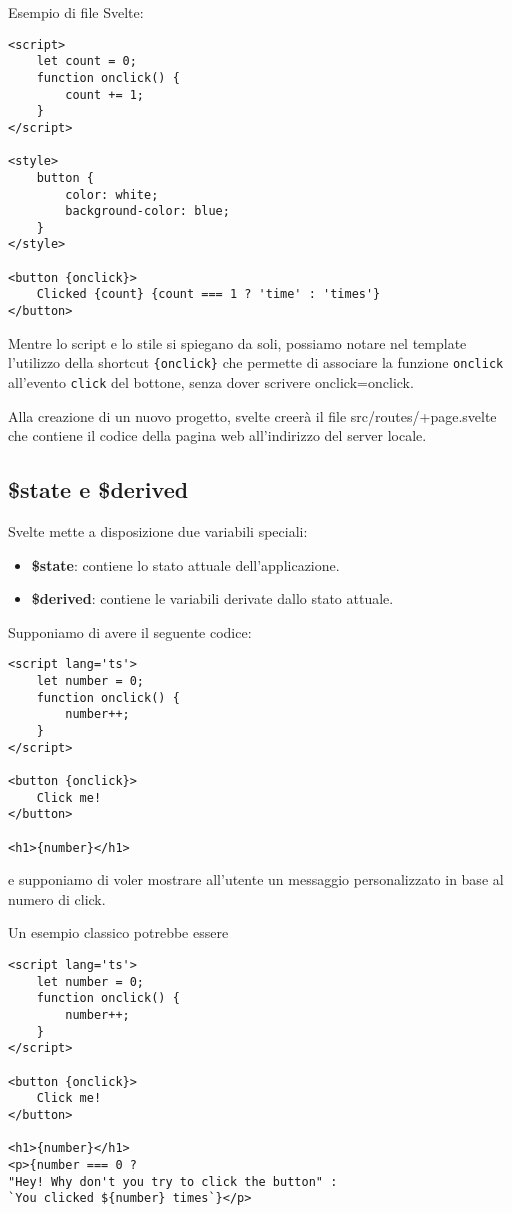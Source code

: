 \documentclass[12pt]{article}
\newcommand{\important}[1]{\textcolor{accent}{\textbf{#1}}}
\begin{document}
\pagebreak
Esempio di file Svelte:
\begin{verbatim}
<script>
    let count = 0;
    function onclick() {
        count += 1;
    }
</script>

<style>
    button {
        color: white;
        background-color: blue;
    }
</style>

<button {onclick}>
    Clicked {count} {count === 1 ? 'time' : 'times'}
</button>
\end{verbatim}

Mentre lo script e lo stile si spiegano da soli, possiamo notare nel template 
l'utilizzo della shortcut {\tt \{onclick\}} che permette di associare la funzione
{\tt onclick} all'evento {\tt click} del bottone, senza dover scrivere onclick={onclick}.

\begin{highlight}
    Alla creazione di un nuovo progetto, svelte creerà il file src/routes/+page.svelte 
    che contiene il codice della pagina web all'indirizzo del server locale.
\end{highlight}

\subsection{\$state e \$derived}
Svelte mette a disposizione due variabili speciali:
\begin{itemize}
    \item \important{\$state}: contiene lo stato attuale dell'applicazione.
    \item \important{\$derived}: contiene le variabili derivate dallo stato attuale.
\end{itemize}

Supponiamo di avere il seguente codice:
\begin{verbatim}
<script lang='ts'>
    let number = 0;
    function onclick() {
        number++;
    }
</script>

<button {onclick}>
    Click me!
</button>

<h1>{number}</h1>
\end{verbatim}
e supponiamo di voler mostrare all'utente un messaggio personalizzato
in base al numero di click.

Un esempio classico potrebbe essere
\begin{verbatim}
<script lang='ts'>
    let number = 0;
    function onclick() {
        number++;
    }
</script>

<button {onclick}>
    Click me!
</button>

<h1>{number}</h1>
<p>{number === 0 ? 
"Hey! Why don't you try to click the button" :
`You clicked ${number} times`}</p>
\end{verbatim}
\end{document}
